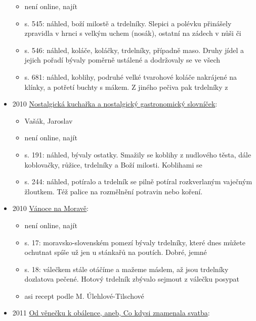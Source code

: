 \begin{itemize}
  \begin{itemize}
  \tightlist
  \item
    není online, najít
  \item
    s. 545: náhled, boží milostě a trdelníky. Slepici a polévku
    přinášely zpravidla v hrnci s velkým uchem (nosák), ostatní na
    zádech v nůši či
  \item
    s. 546: náhled, koláče, koláčky, trdelníky, případně maso. Druhy
    jídel a jejich pořadí bývaly poměrně ustálené a dodržovaly se ve
    všech
  \item
    s. 681: náhled, koblihy, podruhé velké tvarohové koláče nakrájené na
    klínky, a potřetí buchty s mákem. Z jiného pečiva pak trdelníky z
  \end{itemize}
\item
  2010
  \href{https://ceskadigitalniknihovna.cz/uuid/uuid:46f5c8f0-d962-11ef-8f57-005056827e51}{Nostalgická
  kuchařka a nostalgický gastronomický slovníček}:

  \begin{itemize}
  \tightlist
  \item
    Vašák, Jaroslav
  \item
    není online, najít
  \item
    s. 191: náhled, bývaly ostatky. Smažily se koblihy z nudlového
    těsta, dále koblovačky, růžice, trdelníky a Boží milosti. Koblihami
    se
  \item
    s. 244: náhled, potíralo a trdelník se pilně potíral rozkverlaným
    vaječným žloutkem. Též palice na rozmělnění potravin nebo koření.
  \end{itemize}
\item
  2010
  \href{https://ceskadigitalniknihovna.cz/uuid/uuid:ed1ed830-6889-11e8-8470-005056827e52}{Vánoce
  na Moravě}:

  \begin{itemize}
  \tightlist
  \item
    není online, najít
  \item
    s. 17: moravsko-slovenském pomezí bývaly trdelníky, které dnes
    můžete ochutnat spíše už jen u stánkařů na poutích. Dobré, jemné
  \item
    s. 18: válečkem stále otáčíme a mažeme máslem, až jsou trdelníky
    dozlatova pečené. Hotový trdelník zbývalo sejmout z válečku posypat
  \item
    asi recept podle M. Úlehlové-Tilschové
  \end{itemize}
\item
  2011
  \href{https://ceskadigitalniknihovna.cz/uuid/uuid:05e8afb0-ef6c-11e5-bdc9-005056827e52}{Od
  věnečku k obálence, aneb, Co kdysi znamenala svatba}:


\end{itemize}
